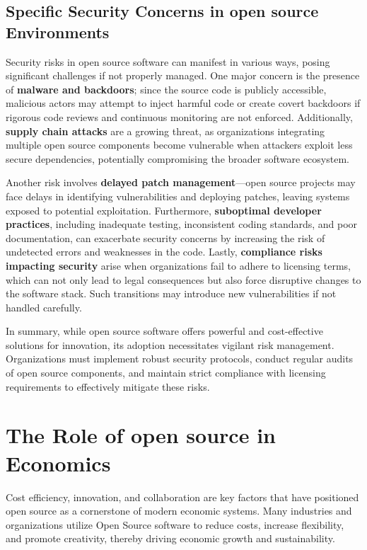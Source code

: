 \cite{OpenSource-Software-Risks-Disadvantages}

\subsection{Specific Security Concerns in open source Environments}
Security risks in open source software can manifest in various ways, posing significant challenges if not properly managed. One major concern is the presence of \textbf{malware and backdoors}; since the source code is publicly accessible, malicious actors may attempt to inject harmful code or create covert backdoors if rigorous code reviews and continuous monitoring are not enforced. Additionally, \textbf{supply chain attacks} are a growing threat, as organizations integrating multiple open source components become vulnerable when attackers exploit less secure dependencies, potentially compromising the broader software ecosystem. 

Another risk involves \textbf{delayed patch management}—open source projects may face delays in identifying vulnerabilities and deploying patches, leaving systems exposed to potential exploitation. Furthermore, \textbf{suboptimal developer practices}, including inadequate testing, inconsistent coding standards, and poor documentation, can exacerbate security concerns by increasing the risk of undetected errors and weaknesses in the code. Lastly, \textbf{compliance risks impacting security} arise when organizations fail to adhere to licensing terms, which can not only lead to legal consequences but also force disruptive changes to the software stack. Such transitions may introduce new vulnerabilities if not handled carefully.

\cite{OpenSource-Software-Risks-ConnectWise}

In summary, while open source software offers powerful and cost-effective solutions for innovation, its adoption necessitates vigilant risk management. Organizations must implement robust security protocols, conduct regular audits of open source components, and maintain strict compliance with licensing requirements to effectively mitigate these risks.

\section{The Role of open source in Economics}

Cost efficiency, innovation, and collaboration are key factors that have positioned open source as a cornerstone of modern economic systems. Many industries and organizations utilize Open Source software to reduce costs, increase flexibility, 
and promote creativity, thereby driving economic growth and sustainability.

